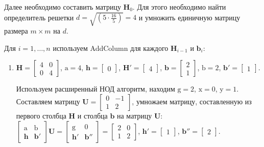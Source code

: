 Далее необходимо составить матрицу $ \mathbf{H}_0 $. Для этого необходимо найти определитель решетки $ d = \sqrt{(5 \cdot \frac{16}{5})} = 4 $ и умножить единичную матрицу размера $ m \times m $ на $ d $. 

Для $ i = 1, \ldots, n $ используем AddColumn для каждого $ \mathbf{H}_{i - 1} $ и $ \mathbf{b}_i $:
\begin{enumerate}

\item $ \mathbf{H} = \left[\begin{array}{cccc}
4 & 0 \\
0 & 4
\end{array}\right] $, $ \mathrm{a} = 4 $, $ \mathbf{h} = \left[\begin{array}{cccc}
0 
\end{array}\right] $, $ \mathbf{H}' = \left[ \begin{array}{cccc}
4
\end{array}\right] $, $ \mathbf{b} = \left[\begin{array}{cccc}
2 \\
1
\end{array}\right] $, $ \mathrm{b} = 2 $, $ \mathbf{b}' = \left[ \begin{array}{cccc}
1
\end{array}\right] $.

Используем расширенный НОД алгоритм, находим $ \mathrm{g} = 2 $, $ \mathrm{x} = 0 $, $ \mathrm{y} = 1 $. Составляем матрицу $  \mathbf{U} = \left[\begin{array}{cccc}
0 & -1 \\
1 & 2
\end{array}\right] $, умножаем матрицу, составленную из первого столбца $ \mathbf{H} $ и столбца $ \mathbf{b} $ на матрицу $ \mathbf{U} $: $ \left[ \begin{array}{cccc}
\mathrm{a} & \mathrm{b} \\
\mathbf{h} & \mathbf{b}' \end{array} \right] \mathbf{U}=
\left[ \begin{array}{cccc}
\mathrm{g} & \mathrm{0} \\
\mathbf{h}' & \mathbf{b}'' \end{array} \right] = \left[\begin{array}{cccc}
2 & 0 \\
1 & 2
\end{array}\right] $, $ \mathbf{h}' = \left[\begin{array}{cccc}
1
\end{array}\right] $, $ \mathbf{b}'' = \left[\begin{array}{cccc}
2
\end{array}\right] $.


\end{enumerate}
